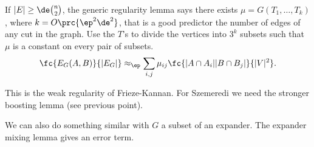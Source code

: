 \begin{enumerate}
If $|E|\ge \de \binom n2$, the generic regularity lemma says there exists $\mu=G(T_1,\ldots, T_k)$, where $k=O\prc{\ep^2\de^2}$, that is a good predictor the number of edges of any cut in the graph. 
Use the $T$'s to divide the vertices into $3^k$ subsets such that $\mu$ is a constant on every pair of subsets.
$$
\fc{E_G(A,B)}{|E_G|}
\approx_\ep \sum_{i,j} 
\mu_{ij}
\fc{|A\cap A_i||B\cap B_j|}{|V|^2}.
$$

This is the weak regularity of Frieze-Kannan. For Szemeredi we need the stronger boosting lemma (see previous point).

We can also do something similar with $G$ a subset of an expander. The expander mixing lemma gives an error term.
\end{enumerate}
